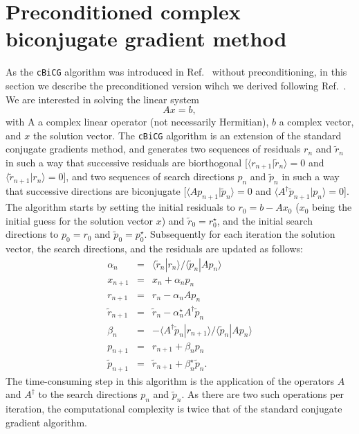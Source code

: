 \documentclass[twocolumn,prb,showpacs,superscriptaddress]{revtex4}
\def\>{\rangle}
\def\<{\langle}
\def\rt{\tilde{r}}
\def\pt{\tilde{p}}
\begin{document}
\section{Preconditioned complex biconjugate gradient method}

As the {\tt cBiCG} algorithm was introduced in Ref.\  
without preconditioning, in this section we describe the preconditioned version 
wihch we derived following Ref.~.
%
We are interested in solving the linear system
  \begin{equation}\label{eq.axeqb}
  Ax=b,
  \end{equation}
with A a complex linear operator (not necessarily Hermitian), $b$ a complex 
vector, and $x$ the solution vector.
The {\tt cBiCG} algorithm is an extension of the standard conjugate
gradients method, and generates two sequences of residuals $r_n$ and
$\rt_n$ in such a way that successive residuals 
are biorthogonal [$\<r_{n+1}|\rt_n\>=0$ and $\<\rt_{n+1}|r_n\>=0$], 
and two sequences of search directions 
$p_n$ and $\pt_n$ in such a way that successive directions
are biconjugate [$\< A p_{n+1}|\pt_n \> =0$ and 
$\< A^\dagger \pt_{n+1}|p_n \> =0$].\cite{jacobs}
The algorithm starts by setting the initial residuals to
$r_0 = b-Ax_0$ ($x_0$ being the initial guess for the solution vector $x$) 
and $\rt_0=r_0^\star$, and the initial search directions to $p_0=r_0$ 
and $\pt_0=p_0^\star$.
Subsequently for each iteration the solution
vector, the search directions, and the residuals are updated as follows:
  \begin{eqnarray}
  \alpha_n & = & \<\rt_n|r_n\>/\<\pt_n|Ap_n\> \label{eq.cg1}  \\ 
  x_{n+1} & = & x_n + \alpha_n p_n \label{eq.cg2} \\ 
  r_{n+1} & = & r_n - \alpha_n Ap_n \label{eq.cg3} \\ 
  \rt_{n+1} & = & \rt_n - \alpha_n^\star A^\dagger \pt_n \label{eq.cg4}\\ 
  \beta_n & = & - \<A^\dagger\pt_n|r_{n+1}\>/\<\pt_n|Ap_n\> \label{eq.cg5}\\ 
  p_{n+1} & = & r_{n+1} + \beta_n p_n \label{eq.cg6}\\ 
  \pt_{n+1} & = & \rt_{n+1} + \beta_n^\star \label{eq.cg7} \pt_n. 
  \end{eqnarray}
The time-consuming step in this algorithm is the application of the operators
$A$ and $A^\dagger$ to the search directions $p_n$ and $\pt_n$. 
As there are two such operations per iteration, the computational complexity 
is twice that of the standard conjugate gradient algorithm.
\end{document}
